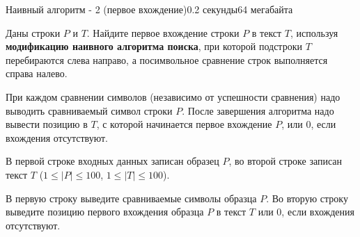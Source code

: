 \begin{problem}{Наивный алгоритм - 2 (первое вхождение)}{}{}{0.2 секунды}{64 мегабайта}

Даны строки $P$ и $T$. Найдите первое вхождение строки $P$ в текст $T$, используя {\bf модификацию наивного алгоритма поиска}, 
при которой подстроки $T$ перебираются слева направо, а посимвольное сравнение строк выполняется справа налево.

При каждом сравнении символов (независимо от успешности сравнения) надо выводить сравниваемый символ строки $P$. 
После завершения алгоритма надо вывести позицию в $T$, с которой начинается первое вхождение $P$, или $0$, если вхождения отсутствуют. 

\InputFile
В первой строке входных данных записан образец $P$, 
во второй строке записан текст $T$ ($1 \le |P| \le 100$, $1 \le |T| \le 100$).


\OutputFile
В первую строку выведите сравниваемые символы образца $P$.
Во вторую строку выведите позицию первого вхождения образца $P$ в текст $T$ или $0$, если вхождения отсутствуют.


\Examples

\begin{example}
%
\end{example}

\end{problem}
